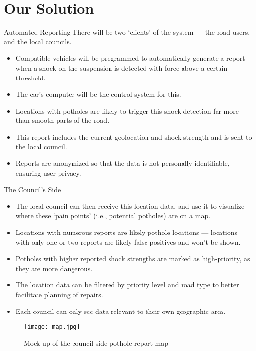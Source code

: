 \documentclass{beamer}
\begin{document}
\section{Our Solution}

\begin{frame}{Automated Reporting}
    There will be two `clients' of the system --- the road users, and the local councils.

    \begin{itemize}
        \item Compatible vehicles will be programmed to automatically generate a report when a shock on the suspension is detected with force above a certain threshold.
        \item The car's computer will be the control system for this.
        \item Locations with potholes are likely to trigger this shock-detection far more than smooth parts of the road.
        \item This report includes the current geolocation and shock strength and is sent to the local council.
        \item Reports are anonymized so that the data is not personally identifiable, ensuring user privacy.
    \end{itemize}
\end{frame}

\begin{frame}{The Council's Side}
    \begin{itemize}
        \item The local council can then receive this location data, and use it to visualize where these `pain points' (i.e., potential potholes) are on a map.
        \item Locations with numerous reports are likely pothole locations --- locations with only one or two reports are likely false positives and won't be shown.
        \item Potholes with higher reported shock strengths are marked as high-priority, as they are more dangerous.
        \item The location data can be filtered by priority level and road type to better facilitate planning of repairs.
        \item Each council can only see data relevant to their own geographic area.
    \end{itemize}    
\end{frame}

\begin{frame}
    \begin{figure}
        \texttt{[image: map.jpg]}
        \caption{Mock up of the council-side pothole report map}
    \end{figure}    
\end{frame}
\end{document}
